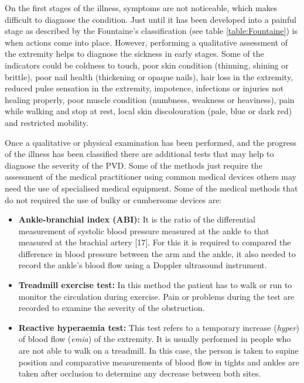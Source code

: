 On the first stages of the illness, symptoms are not noticeable, which makes difficult to diagnose the condition. Just until it has been developed into a painful stage as described by the Fountaine's classification (see table \ref{table:Fountaine}) is when actions come into place. However, performing a qualitative assessment of the extremity helps to diagnose the sickness in early stages. Some of the indicators could be coldness to touch, poor skin condition (thinning, shining or brittle), poor nail health (thickening or opaque nails), hair loss in the extremity, reduced pulse sensation in the extremity, impotence, infections or injuries not healing properly, poor muscle condition (numbness, weakness or heaviness), pain while walking and stop at rest, local skin discolouration (pale, blue or dark red) and restricted mobility. 

Once a qualitative or physical examination has been performed, and the progress of the illness has been classified there are additional tests that may help to diagnose the severity of the PVD. Some of the methods just require the assessment of the medical practitioner using common medical devices others may need the use of specialised medical equipment. Some of the medical methods that do not required the use of bulky or cumbersome devices are:

\begin{itemize}
    \item \textbf{Ankle-branchial index (ABI):} It is the ratio of the differential measurement of systolic blood pressure measured at the ankle to that measured at the brachial artery [17]. For this it is required to compared the difference in blood pressure between the arm and the ankle, it also needed to record the ankle's blood flow using a Doppler ultrasound instrument.  
    \item \textbf{Treadmill exercise test: }In this method the patient has to walk or run to monitor the circulation during exercise. Pain or problems during the test are recorded to examine the severity of the obstruction.
    \item \textbf{Reactive hyperaemia test:} This test refers to a temporary increase (\textit{hyper}) of blood flow (\textit{emia}) of the extremity. It is usually performed in people who are not able to walk on a treadmill. In this case, the person is taken to supine position and comparative measurements of blood flow in tights and ankles are taken after occlusion to determine any decrease between both sites. 
\end{itemize}


